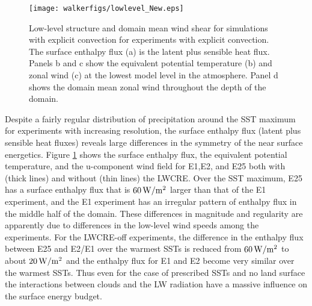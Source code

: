 \documentclass[draft]{agujournal2019}
\begin{document}
{\begin{figure}
  \centering       
    \texttt{[image: walkerfigs/lowlevel\_New.eps]}
    \caption{Low-level structure and domain mean wind shear for simulations with explicit convection for experiments
    with explicit convection.  The surface enthalpy flux (a) is the latent plus sensible heat flux.  Panels b and c show 
    the equivalent potential temperature (b) and zonal wind (c) at the lowest model level in the atmosphere.  Panel 
    d shows the domain mean zonal wind throughout the depth of the domain.}
    \label{fig:enthalpy}
\end{figure}

Despite a fairly regular distribution of precipitation around the SST maximum for experiments with increasing resolution, the 
surface enthalpy flux (latent plus sensible heat fluxes) reveals large differences in the symmetry of the near surface energetics.   
Figure \ref{fig:enthalpy} shows the surface enthalpy flux, 
the equivalent potential temperature, and the u-component wind field for E1,E2, and E25 both with (thick lines) and 
without (thin lines) the LWCRE.  Over the SST maximum, E25 has a surface enthalpy flux that is $60 \, \rm{W/m^2}$ 
larger than that of the E1 experiment, and the E1 experiment has an irregular pattern of enthalpy flux in the middle
half of the domain.  These differences in magnitude and regularity are apparently due to differences in the low-level 
wind speeds among the experiments.  For the LWCRE-off experiments, the difference in the enthalpy flux between E25 and E2/E1 
over the warmest SSTs is reduced from $60 \, \rm{W/m^2}$ to about $20 \, \rm{W/m^2}$ and the enthalpy
flux for E1 and  E2 become very similar over the warmest SSTs.   Thus even for the case of prescribed SSTs and no
land surface the interactions between clouds and the LW radiation have a massive influence on the 
surface energy budget.


}
\end{document}
